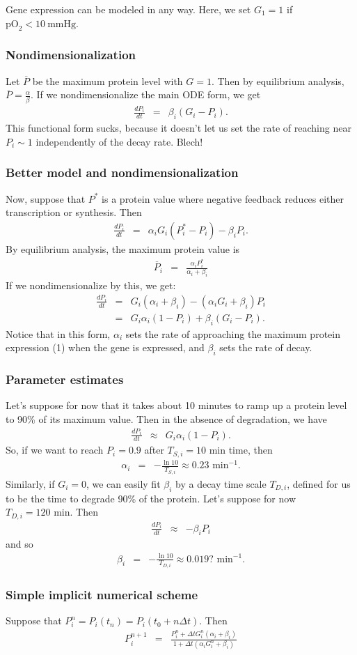 \documentclass[12pt]{article}
\newcommand{\oxy}{  {\textrm{pO}_2} }
\newcommand{\mmHg}{\: \textrm{mmHg} }
\newcommand{\beqa}{\begin{eqnarray}}
\newcommand{\eeqa}{\end{eqnarray}}
\begin{document}
Gene expression can be modeled in any way. Here, we set $G_1 =1$ if $\oxy < 10 \mmHg$. 

\subsubsection{Nondimensionalization}
Let $\overline{P}$ be the maximum protein level with $G = 1$. Then by equilibrium analysis, 
$\overline{P} = \frac{\alpha}{\beta}$. If we nondimensionalize the main ODE form, we get 
\beqa
\frac{dP_i}{dt} & = & \beta_i \left( G_i - P_i \right). 
\eeqa
This functional form sucks, because it doesn't let us set the rate of reaching near $P_i \sim 1$ independently 
of the decay rate. Blech!

\subsubsection{Better model and nondimensionalization}
Now, suppose that $P^*$ is a protein value where negative feedback reduces either transcription or synthesis. Then 
\beqa
\frac{ dP_i }{dt } & = & \alpha_i G_i \left( P_i^* - P_i \right) - \beta_i P_i. 
\eeqa
By equilibrium analysis, the maximum protein value is 
\beqa
\overline{P}_i & =& 
\frac{\alpha_i P_i^*}{\alpha_i + \beta_i }
\eeqa
If we nondimensionalize by this, we get: 
\beqa
\frac{ dP_i }{dt} & = & 
G_i \left( \alpha_i + \beta_i \right) - \left( \alpha_i G_i + \beta_i \right) P_i \nonumber \\
& = & 
G_i \alpha_i \left( 1 - P_i \right) + \beta_i \left( G_i - P_i \right) . 
\eeqa
Notice that in this form, $\alpha_i$ sets the rate of approaching the maximum protein expression (1) 
when the gene is expressed, and $\beta_i$ sets the rate of decay. 

\subsubsection{Parameter estimates}
Let's suppose for now that it takes about 10 minutes to ramp up a protein level to 90\% of its 
maximum value. Then in the absence of degradation, we have 
\beqa
\frac{dP_i}{dt} & \approx & G_i \alpha_i \left( 1 - P_i \right). 
\eeqa
So, if we want to reach $P_i = 0.9$ after $T_{S,i} = 10 \textrm{ min}$ time, then 
\beqa
\alpha_i &  =&  -\frac{ \ln{10} }{ T_{S,i} } \approx 0.23  \textrm{ min}^{-1}. 
\eeqa
Similarly, if $G_i = 0$, we can easily fit $\beta_i$ by a decay time scale $T_{D,i}$, defined 
for us to be the time to degrade 90\% of the protein. Let's suppose for now $T_{D,i} = 120 \textrm{ min}$. 
Then 
\beqa
\frac{dP_i}{dt} & \approx & - \beta_i  P_i  
\eeqa
and so 
\beqa
\beta_i & = & -\frac{ \ln{10} }{ T_{D,i} } \approx 0.019 ? \textrm{ min}^{-1}. 
\eeqa

\subsubsection{Simple implicit numerical scheme}
Suppose that $P_i^n = P_i( t_n ) = P_i ( t_0 + n \Delta t)$. Then 
\beqa
P^{n+1}_i 
& = & 
\frac{ P_i^n + \Delta t G_i^n \left( \alpha_i + \beta_i \right) }{ 1 + \Delta t \left( \alpha_i G_i^n + \beta_i \right)}
\eeqa
\end{document}
